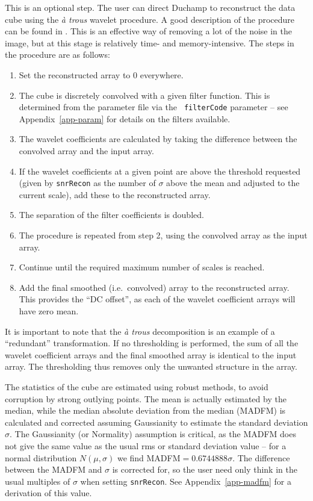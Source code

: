 \documentclass[12pt,a4paper]{article}
\newcommand{\ie}{i.e.\ }
\begin{document}
This is an optional step. The user can direct Duchamp to
reconstruct the data cube using the {\it {\`a} trous} wavelet
procedure. A good description of the procedure can be found in
\citet{starck02:book}. This is an effective way of removing a
lot of the noise in the image, but at this stage is relatively time-
and memory-intensive. The steps in the procedure are as follows:
\begin{enumerate}
\item Set the reconstructed array to 0 everywhere.
\item The cube is discretely convolved with a given filter
  function. This is determined from the parameter file via the {\tt
  filterCode} parameter -- see Appendix~\ref{app-param} for details on
  the filters available.
\item The wavelet coefficients are calculated by taking the difference
  between the convolved array and the input array.
\item If the wavelet coefficients at a given point are above the
  threshold requested (given by {\tt snrRecon} as the number of
  $\sigma$ above the mean and adjusted to the current scale), add
  these to the reconstructed array.
\item The separation of the filter coefficients is doubled.
\item The procedure is repeated from step 2, using the convolved array
  as the input array.
\item Continue until the required maximum number of scales is reached.
\item Add the final smoothed (\ie convolved) array to the
  reconstructed array. This provides the ``DC offset'', as each of the
  wavelet coefficient arrays will have zero mean.
\end{enumerate}

It is important to note that the {\it {\`a} trous} decomposition is
an example of a ``redundant'' transformation. If no thresholding is
performed, the sum of all the wavelet coefficient arrays and the final
smoothed array is identical to the input array. The thresholding thus
removes only the unwanted structure in the array. 

The statistics of the cube are estimated using robust methods, to
avoid corruption by strong outlying points. The mean is actually
estimated by the median, while the median absolute deviation from the
median (MADFM) is calculated and corrected assuming Gaussianity to
estimate the standard deviation $\sigma$. The Gaussianity (or
Normality) assumption is critical, as the MADFM does not give the same
value as the usual rms or standard deviation value -- for a normal
distribution $N(\mu,\sigma)$ we find MADFM$=0.6744888\sigma$. The
difference between the MADFM and $\sigma$ is corrected for, so the
user need only think in the usual multiples of $\sigma$ when setting
{\tt snrRecon}. See Appendix~\ref{app-madfm} for a derivation of this
value.
\end{document}

